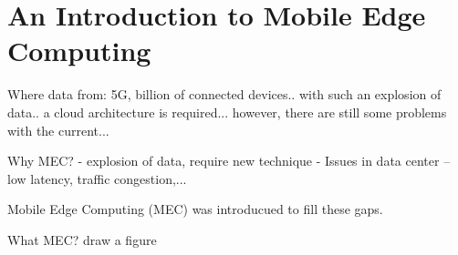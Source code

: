 \section{An Introduction to Mobile Edge Computing}  \label{intro}


Where data from: 5G, billion of connected devices.. with  such an explosion of data.. a cloud architecture is required... however, there are still some problems with the current...


Why MEC? 
  - explosion of data, require new technique
  - Issues in data center -- low latency, traffic congestion,...

Mobile Edge Computing (MEC) was introducued to fill these gaps.

What MEC? draw a figure
